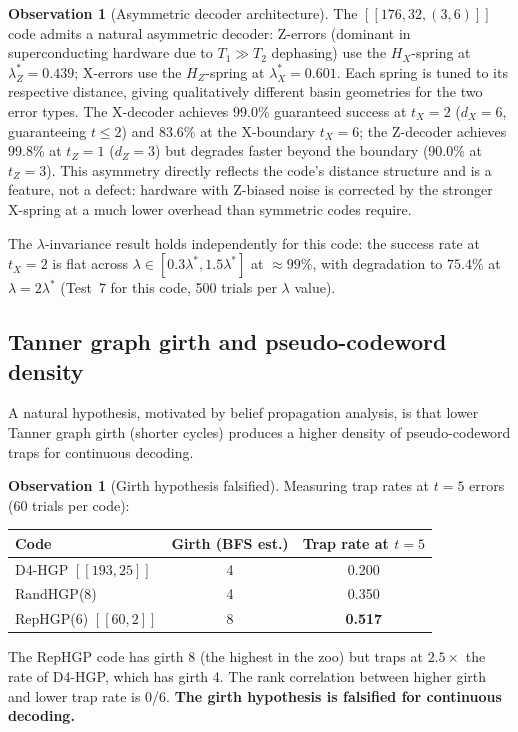 \documentclass[12pt,a4paper]{article}
\theoremstyle{plain}
\theoremstyle{definition}
\newtheorem{observation}[theorem]{Observation}
\theoremstyle{remark}
\begin{document}
\begin{observation}[Asymmetric decoder architecture]
\label{obs:asymmetric}
The $[[176,32,(3,6)]]$ code admits a natural asymmetric decoder:
Z-errors (dominant in superconducting hardware due to $T_1 \gg T_2$
dephasing) use the $H_X$-spring at $\lambda_Z^*=0.439$;
X-errors use the $H_Z$-spring at $\lambda_X^*=0.601$.
Each spring is tuned to its respective distance, giving qualitatively
different basin geometries for the two error types.
The X-decoder achieves 99.0\% guaranteed success at $t_X=2$
($d_X=6$, guaranteeing $t\leq2$) and 83.6\% at the X-boundary
$t_X=6$; the Z-decoder achieves 99.8\% at $t_Z=1$ ($d_Z=3$)
but degrades faster beyond the boundary (90.0\% at $t_Z=3$).
This asymmetry directly reflects the code's distance structure and
is a feature, not a defect: hardware with Z-biased noise is
corrected by the stronger X-spring at a much lower overhead than
symmetric codes require.
\end{observation}

The $\lambda$-invariance result holds independently for this code:
the success rate at $t_X=2$ is flat across
$\lambda \in [0.3\lambda^*, 1.5\lambda^*]$ at $\approx99\%$,
with degradation to $75.4\%$ at $\lambda = 2\lambda^*$ (Test~7
for this code, 500 trials per $\lambda$ value).

\subsection{Tanner graph girth and pseudo-codeword density}

A natural hypothesis, motivated by belief propagation analysis, is that
lower Tanner graph girth (shorter cycles) produces a higher density of
pseudo-codeword traps for continuous decoding.

\begin{observation}[Girth hypothesis falsified]\label{obs:girth}
Measuring trap rates at $t=5$ errors (60 trials per code):

\begin{center}
\begin{tabular}{lcc}
\toprule
Code & Girth (BFS est.) & Trap rate at $t=5$ \\
\midrule
D4-HGP $[[193,25]]$ & 4 & 0.200 \\
RandHGP(8) & 4 & 0.350 \\
RepHGP(6) $[[60,2]]$ & 8 & \textbf{0.517} \\
\bottomrule
\end{tabular}
\end{center}

The RepHGP code has girth 8 (the highest in the zoo) but traps at $2.5\times$
the rate of D4-HGP, which has girth 4.
The rank correlation between higher girth and lower trap rate is 0/6.
\textbf{The girth hypothesis is falsified for continuous decoding.}
\end{observation}
\end{document}
